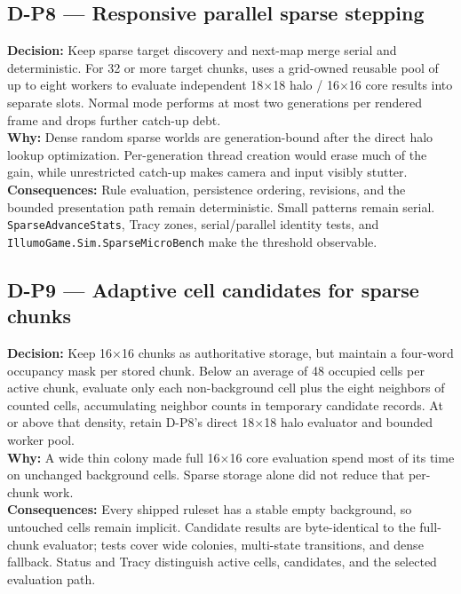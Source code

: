 \subsection*{D-P8 --- Responsive parallel sparse stepping}
\begin{decisionbox}[title={D-P8 \quad 2026-08-07}]
\textbf{Decision:} Keep sparse target discovery and next-map merge serial and
deterministic. For 32 or more target chunks,  uses a
grid-owned reusable pool of up to eight workers to evaluate independent
18$\times$18 halo / 16$\times$16 core results into separate slots. Normal mode
performs at most two generations per rendered frame and drops further catch-up
debt.\\
\textbf{Why:} Dense random sparse worlds are generation-bound after the direct
halo lookup optimization. Per-generation thread creation would erase much of
the gain, while unrestricted catch-up makes camera and input visibly stutter.\\
\textbf{Consequences:} Rule evaluation, persistence ordering, revisions, and
the bounded presentation path remain deterministic. Small patterns remain
serial. \texttt{SparseAdvanceStats}, Tracy zones, serial/parallel identity
tests, and \texttt{IllumoGame.Sim.SparseMicroBench} make the threshold observable.
\end{decisionbox}

\subsection*{D-P9 --- Adaptive cell candidates for sparse chunks}
\begin{decisionbox}[title={D-P9 \quad 2026-08-08}]
\textbf{Decision:} Keep 16$\times$16 chunks as authoritative storage, but
maintain a four-word occupancy mask per stored chunk. Below an average of 48
occupied cells per active chunk, evaluate only each non-background cell plus
the eight neighbors of counted cells, accumulating neighbor counts in temporary
candidate records. At or above that density, retain D-P8's direct 18$\times$18
halo evaluator and bounded worker pool.\\
\textbf{Why:} A wide thin colony made full 16$\times$16 core evaluation spend
most of its time on unchanged background cells. Sparse storage alone did not
reduce that per-chunk work.\\
\textbf{Consequences:} Every shipped ruleset has a stable empty background, so
untouched cells remain implicit. Candidate results are byte-identical to the
full-chunk evaluator; tests cover wide colonies, multi-state transitions, and
dense fallback. Status and Tracy distinguish active cells, candidates, and the
selected evaluation path.
\end{decisionbox}

